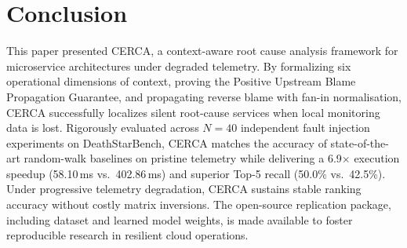 \documentclass[conference]{IEEEtran}
\begin{document}
\section{Conclusion}

This paper presented CERCA, a context-aware root cause analysis framework for microservice architectures under degraded telemetry. By formalizing six operational dimensions of context, proving the Positive Upstream Blame Propagation Guarantee, and propagating reverse blame with fan-in normalisation, CERCA successfully localizes silent root-cause services when local monitoring data is lost. Rigorously evaluated across $N = 40$ independent fault injection experiments on DeathStarBench, CERCA matches the accuracy of state-of-the-art random-walk baselines on pristine telemetry while delivering a 6.9$\times$ execution speedup (58.10\,ms vs.\ 402.86\,ms) and superior Top-5 recall (50.0\% vs.\ 42.5\%). Under progressive telemetry degradation, CERCA sustains stable ranking accuracy without costly matrix inversions. The open-source replication package, including dataset and learned model weights, is made available to foster reproducible research in resilient cloud operations.
\end{document}
